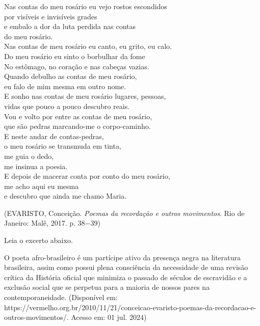 \begin{minipage}[t]{0.49\linewidth}
Nas contas do meu rosário eu vejo rostos escondidos\\
por visíveis e invisíveis grades\\
e embalo a dor da luta perdida nas contas\\
do meu rosário.\\
Nas contas de meu rosário eu canto, eu grito, eu calo.\\
Do meu rosário eu sinto o borbulhar da fome\\
No estômago, no coração e nas cabeças vazias.\\
Quando debulho as contas de meu rosário,\\
eu falo de mim mesma em outro nome.\\
E sonho nas contas de meu rosário lugares, pessoas,\\
vidas que pouco a pouco descubro reais.\\
Vou e volto por entre as contas de meu rosário,\\
que são pedras marcando-me o corpo-caminho.\\
E neste andar de contas-pedras,\\
o meu rosário se transmuda em tinta,\\
me guia o dedo,\\
me insinua a poesia.\\
E depois de macerar conta por conto do meu rosário,\\
me acho aqui eu mesma\\
e descubro que ainda me chamo Maria.
\end{minipage}

\begin{center}(EVARISTO, Conceição. \textit{Poemas da recordação e outros movimentos}. Rio de Janeiro: Malê, 2017. p. 38−39)\end{center}

Leia o excerto abaixo.

\par

O poeta afro-brasileiro é um partícipe ativo da presença negra na literatura brasileira, assim como possui plena consciência da necessidade de uma revisão crítica da História oficial que minimiza o passado de séculos de escravidão e a exclusão social que se perpetua para a maioria de nossos pares na contemporaneidade. (Disponível em: https://vermelho.org.br/2010/11/21/conceicao-evaristo-poemas-da-recordacao-e-outros-movimentos/. Acesso em: 01 jul. 2024)

